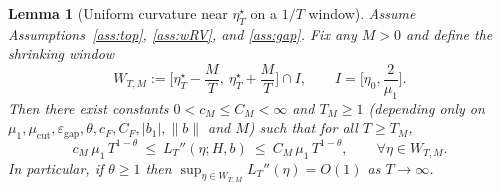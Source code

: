 \documentclass[11pt]{article}
\newtheorem{lemma}{Lemma}
\begin{document}
\begin{lemma}[Uniform curvature near $\eta_T^\star$ on a $1/T$ window]
\label{lem:curv-window}
Assume Assumptions~\ref{ass:top}, \ref{ass:wRV}, and \ref{ass:gap}. Fix any $M>0$ and
define the shrinking window
\[
W_{T,M}
:=
\Big[\eta_T^\star-\frac{M}{T},\ \eta_T^\star+\frac{M}{T}\Big]\cap I,
\qquad
I=\Big[\eta_0,\frac{2}{\mu_1}\Big].
\]
Then there exist constants $0<c_M\le C_M<\infty$ and $T_M\ge 1$
(depending only on $\mu_1,\mu_{\mathrm{cut}},\varepsilon_{\mathrm{gap}},\theta,c_F,C_F,|b_1|,\|b\|$ and $M$)
such that for all $T\ge T_M$,
\[
c_M\,\mu_1\,T^{1-\theta}
\ \le\
L_T''(\eta;H,b)
\ \le\
C_M\,\mu_1\,T^{1-\theta},
\qquad \forall \eta\in W_{T,M}.
\]
In particular, if $\theta\ge 1$ then $\sup_{\eta\in W_{T,M}} L_T''(\eta)=O(1)$ as $T\to\infty$.
\end{lemma}
\end{document}
